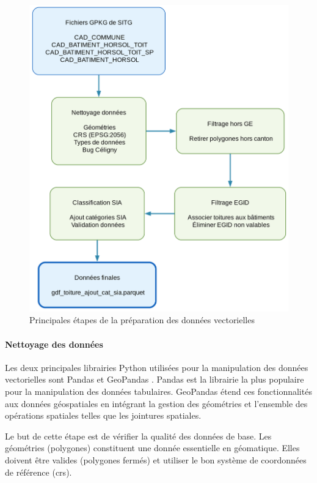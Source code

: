 \begin{figure}[H]
    \centering
    \includegraphics[width=0.95\linewidth]{02-main/figures/ch3/ch3_preparation_donnees_01_etl.png}
    \caption{Principales étapes de la préparation des données vectorielles}
    \label{fig:ch3_preparation_donnees_01_etl}
\end{figure}

\paragraph{Nettoyage des données}
Les deux principales librairies Python utilisées pour la manipulation des données vectorielles sont Pandas \cite{mckinney_pandas_nodate} et GeoPandas \cite{noauthor_geopandas_nodate}. Pandas est la librairie la plus populaire pour la manipulation des données tabulaires. GeoPandas étend ces fonctionnalités aux données géospatiales en intégrant la gestion des géométries et l'ensemble des opérations spatiales telles que les jointures spatiales.

Le but de cette étape est de vérifier la qualité des données de base. Les géométries (polygones) constituent une donnée essentielle en géomatique. Elles doivent être valides (polygones fermés) et utiliser le bon système de coordonnées de référence (\acrshort{crs}).

